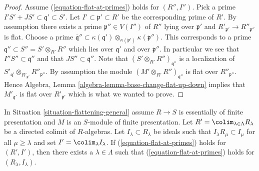 \begin{proof}
Assume (\ref{equation-flat-at-primes}) holds for $(R'', I'')$. Pick a prime
$I'S' + JS' \subset \mathfrak q' \subset S'$. Let
$I' \subset \mathfrak p' \subset R'$ be the corresponding prime of $R'$.
By assumption there exists a prime $\mathfrak p'' \in V(I'')$ of $R''$
lying over $\mathfrak p'$ and $R'_{\mathfrak p'} \to R''_{\mathfrak p''}$
is flat. Choose a prime
$\overline{\mathfrak q}'' \subset
\kappa(\mathfrak q') \otimes_{\kappa(\mathfrak p')} \kappa(\mathfrak p'')$.
This corresponds to a prime $\mathfrak q'' \subset S'' = S' \otimes_{R'} R''$
which lies over $\mathfrak q'$ and over $\mathfrak p''$. In particular
we see that $I''S'' \subset \mathfrak q''$ and that
$JS'' \subset \mathfrak q''$. Note that
$(S' \otimes_{R'} R'')_{\mathfrak q''}$ is a localization of
$S'_{\mathfrak q'} \otimes_{R'_{\mathfrak p'}} R''_{\mathfrak p''}$.
By assumption the module $(M' \otimes_{R'} R'')_{\mathfrak q''}$ is
flat over $R''_{\mathfrak p''}$. Hence
Algebra, Lemma \ref{algebra-lemma-base-change-flat-up-down}
implies that $M'_{\mathfrak q'}$ is flat over $R'_{\mathfrak p'}$
which is what we wanted to prove.
\end{proof}

\begin{lemma}
\label{lemma-limit-preserving-flat-at-primes}
In Situation \ref{situation-flattening-general}
assume $R \to S$ is essentially of finite presentation
and $M$ is an $S$-module of finite presentation. Let
$R' = \colim_{\lambda \in \Lambda} R_\lambda$
be a directed colimit of $R$-algebras. Let $I_\lambda \subset R_\lambda$
be ideals such that $I_\lambda R_\mu \subset I_\mu$ for all
$\mu \geq \lambda$ and set $I' = \colim_\lambda I_\lambda$.
If (\ref{equation-flat-at-primes}) holds for
$(R', I')$, then there exists a $\lambda \in \Lambda$ such that
(\ref{equation-flat-at-primes}) holds for $(R_\lambda, I_\lambda)$.
\end{lemma}

